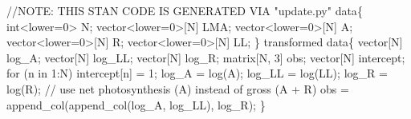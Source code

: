 \documentclass[
  12pt,
  letterpaper,
  DIV=11,
  numbers=noendperiod]{scrartcl}
\newenvironment{Shaded}{\begin{snugshade}}{\end{snugshade}}
\newcommand{\AlertTok}[1]{\textcolor[rgb]{0.68,0.00,0.00}{#1}}
\newcommand{\CommentTok}[1]{\textcolor[rgb]{0.37,0.37,0.37}{#1}}
\newcommand{\ControlFlowTok}[1]{\textcolor[rgb]{0.00,0.23,0.31}{#1}}
\newcommand{\DataTypeTok}[1]{\textcolor[rgb]{0.68,0.00,0.00}{#1}}
\newcommand{\DecValTok}[1]{\textcolor[rgb]{0.68,0.00,0.00}{#1}}
\newcommand{\KeywordTok}[1]{\textcolor[rgb]{0.00,0.23,0.31}{#1}}
\newcommand{\NormalTok}[1]{\textcolor[rgb]{0.00,0.23,0.31}{#1}}
\begin{document}
\begin{Shaded}
\begin{Highlighting}[]
\CommentTok{//}\AlertTok{NOTE}\CommentTok{: THIS STAN CODE IS GENERATED VIA "update.py"}
\KeywordTok{data}\NormalTok{\{}
  \DataTypeTok{int}\NormalTok{\textless{}}\KeywordTok{lower}\NormalTok{=}\DecValTok{0}\NormalTok{\textgreater{} N;}
  \DataTypeTok{vector}\NormalTok{\textless{}}\KeywordTok{lower}\NormalTok{=}\DecValTok{0}\NormalTok{\textgreater{}[N] LMA;}
  \DataTypeTok{vector}\NormalTok{\textless{}}\KeywordTok{lower}\NormalTok{=}\DecValTok{0}\NormalTok{\textgreater{}[N] A;}
  \DataTypeTok{vector}\NormalTok{\textless{}}\KeywordTok{lower}\NormalTok{=}\DecValTok{0}\NormalTok{\textgreater{}[N] R;}
  \DataTypeTok{vector}\NormalTok{\textless{}}\KeywordTok{lower}\NormalTok{=}\DecValTok{0}\NormalTok{\textgreater{}[N] LL;}
\NormalTok{\}}
\KeywordTok{transformed data}\NormalTok{\{}
  \DataTypeTok{vector}\NormalTok{[N] log\_A;}
  \DataTypeTok{vector}\NormalTok{[N] log\_LL;}
  \DataTypeTok{vector}\NormalTok{[N] log\_R;}
  \DataTypeTok{matrix}\NormalTok{[N, }\DecValTok{3}\NormalTok{] obs;}
  \DataTypeTok{vector}\NormalTok{[N] intercept;}
  \ControlFlowTok{for}\NormalTok{ (n }\ControlFlowTok{in} \DecValTok{1}\NormalTok{:N)}
\NormalTok{    intercept[n] = }\DecValTok{1}\NormalTok{;}
\NormalTok{  log\_A = log(A);}
\NormalTok{  log\_LL = log(LL);}
\NormalTok{  log\_R = log(R);}
  \CommentTok{// use net photosynthesis (A) instead of gross (A + R)}
\NormalTok{  obs = append\_col(append\_col(log\_A, log\_LL), log\_R);}
\NormalTok{\}}


\end{Highlighting}
\end{Shaded}
\end{document}
